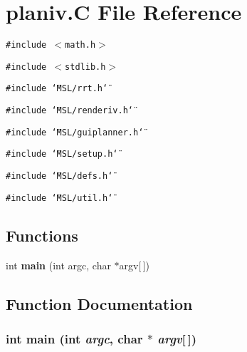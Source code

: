 \section{planiv.C File Reference}
\label{planiv_8C}
{\tt \#include $<$math.h$>$}\par
{\tt \#include $<$stdlib.h$>$}\par
{\tt \#include \char`\"{}MSL/rrt.h\char`\"{}}\par
{\tt \#include \char`\"{}MSL/renderiv.h\char`\"{}}\par
{\tt \#include \char`\"{}MSL/guiplanner.h\char`\"{}}\par
{\tt \#include \char`\"{}MSL/setup.h\char`\"{}}\par
{\tt \#include \char`\"{}MSL/defs.h\char`\"{}}\par
{\tt \#include \char`\"{}MSL/util.h\char`\"{}}\par
\subsection*{Functions}
\begin{CompactItemize}
\item 
int {\bf main} (int argc, char $\ast$argv[$\,$])
\end{CompactItemize}


\subsection{Function Documentation}
\subsubsection{\setlength{\rightskip}{0pt plus 5cm}int main (int {\em argc}, char $\ast$ {\em argv}[$\,$])}\label{planiv_8C_a0}


